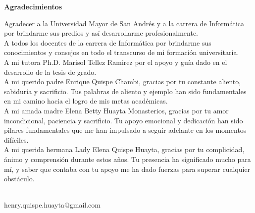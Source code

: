 \begin{center}
  \Large \textbf{Agradecimientos}
\end{center}
Agradecer a la Universidad Mayor de San Andrés y a la carrera de Informática por brindarme sus predios y así desarrollarme profesionalmente. \\
A todos los docentes de la carrera de Informática por brindarme sus conocimientos y consejos en todo el transcurso de mi formación universitaria. \\
A mi tutora Ph.D. Marisol Tellez Ramirez por el apoyo y guía dado en el desarrollo de la tesis de grado. \\
A mi querido padre Enrique Quispe Chambi, gracias por tu constante aliento, sabiduría y sacrificio. Tus palabras de aliento y ejemplo han sido fundamentales en mi camino hacia el logro de mis metas académicas. \\
A mi amada madre Elena Betty Huayta Monasterios, gracias por tu amor incondicional, paciencia y sacrificio. Tu apoyo emocional y dedicación han sido pilares fundamentales que me han impulsado a seguir adelante en los momentos difíciles. \\
A mi querida hermana Lady Elena Quispe Huayta, gracias por tu complicidad, ánimo y comprensión durante estos años. Tu presencia ha significado mucho para mí, y saber que contaba con tu apoyo me ha dado fuerzas para superar cualquier obstáculo. \\\\
\begin{flushright}
  henry.quispe.huayta@gmail.com
\end{flushright}